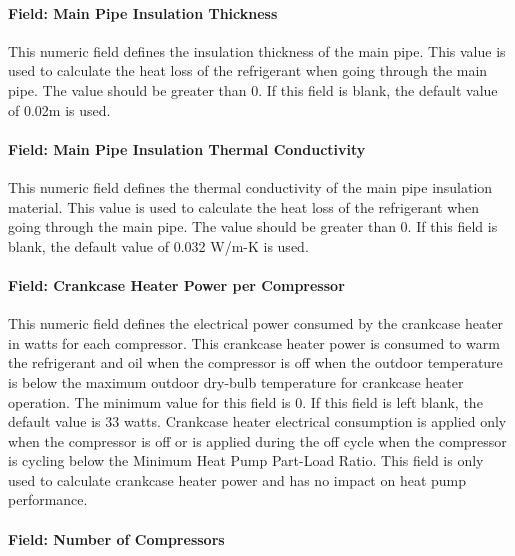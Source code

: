 \paragraph{Field: Main Pipe Insulation Thickness}\label{field-main-pipe-insulation-thickness}

This numeric field defines the insulation thickness of the main pipe. This value is used to calculate the heat loss of the refrigerant when going through the main pipe. The value should be greater than 0. If this field is blank, the default value of 0.02m is used.

\paragraph{Field: Main Pipe Insulation Thermal Conductivity}\label{field-main-pipe-insulation-thermal-conductivity}

This numeric field defines the thermal conductivity of the main pipe insulation material. This value is used to calculate the heat loss of the refrigerant when going through the main pipe. The value should be greater than 0. If this field is blank, the default value of 0.032 W/m-K is used.

\paragraph{Field: Crankcase Heater Power per Compressor}\label{field-crankcase-heater-power-per-compressor-1}

This numeric field defines the electrical power consumed by the crankcase heater in watts for each compressor. This crankcase heater power is consumed to warm the refrigerant and oil when the compressor is off when the outdoor temperature is below the maximum outdoor dry-bulb temperature for crankcase heater operation. The minimum value for this field is 0. If this field is left blank, the default value is 33 watts. Crankcase heater electrical consumption is applied only when the compressor is off or is applied during the off cycle when the compressor is cycling below the Minimum Heat Pump Part-Load Ratio. This field is only used to calculate crankcase heater power and has no impact on heat pump performance.

\paragraph{Field: Number of Compressors}\label{field-number-of-compressors-1}

